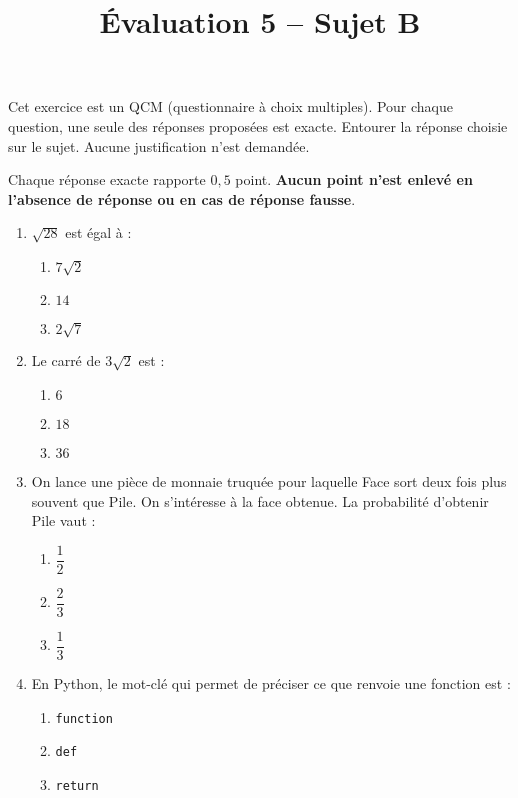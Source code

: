 \documentclass[a4paper,dvipsnames]{article}
\begin{document}
\title{Évaluation 5 -- Sujet B}
\author{}
\date{}

\maketitle{}

\pagestyle{empty}

\exo[2 points]\vspace{-2mm} 
Cet exercice est un QCM (questionnaire à choix multiples). Pour chaque question, une seule des réponses proposées est exacte. Entourer la réponse choisie sur le sujet. Aucune justification n'est demandée.

\smallskip

Chaque réponse exacte rapporte $0,5$ point. \textbf{Aucun point n’est enlevé en l’absence de réponse ou en cas de réponse fausse}.

\begin{enumerate}
  \item $\sqrt{28}$ est égal à :
    \begin{multicols}{3}
      \begin{enumerate}
	\item $7\sqrt{2}$
	\item $14$
	\item $2\sqrt{7}$
      \end{enumerate}
    \end{multicols}
  \item Le carré de $3\sqrt{2}$ est :
    \begin{multicols}{3}
      \begin{enumerate}
	\item $6$
	\item $18$
	\item $36$
      \end{enumerate}
    \end{multicols}
  \item On lance une pièce de monnaie truquée pour laquelle \og{}Face\fg{} sort deux fois plus souvent que \og{}Pile\fg{}. On s'intéresse à la face obtenue. La probabilité d'obtenir \og{}Pile\fg{} vaut :
    \begin{multicols}{3}
      \begin{enumerate}
	\item $\dfrac{1}{2}$
	\item $\dfrac{2}{3}$
	\item $\dfrac{1}{3}$
      \end{enumerate}
    \end{multicols}
  \item En Python, le mot-clé qui permet de préciser ce que renvoie une fonction est :
    \begin{multicols}{3}
      \begin{enumerate}
	\item \texttt{function}
	\item \texttt{def}
	\item \texttt{return}
      \end{enumerate}
    \end{multicols}
\end{enumerate}
\end{document}
